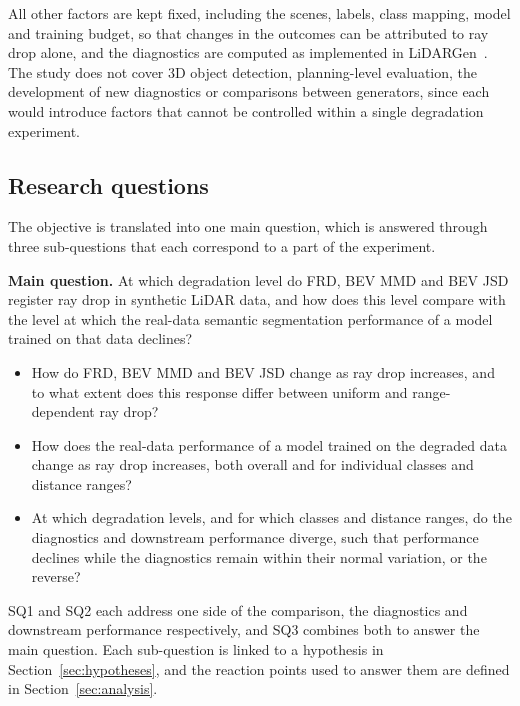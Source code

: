 All other factors are kept fixed, including the scenes, labels, class mapping, model and training budget, so that changes in the outcomes can be attributed to ray drop alone, and the diagnostics are computed as implemented in LiDARGen~\cite{zyrianovLearningGenerateRealistic2022}. The study does not cover 3D object detection, planning-level evaluation, the development of new diagnostics or comparisons between generators, since each would introduce factors that cannot be controlled within a single degradation experiment.

\subsection{Research questions}\label{sec:rq}
The objective is translated into one main question, which is answered through three sub-questions that each correspond to a part of the experiment.

\textbf{Main question.} At which degradation level do FRD, BEV MMD and BEV JSD register ray drop in synthetic LiDAR data, and how does this level compare with the level at which the real-data semantic segmentation performance of a model trained on that data declines?

\begin{itemize}
    \item[\textbf{SQ1}] How do FRD, BEV MMD and BEV JSD change as ray drop increases, and to what extent does this response differ between uniform and range-dependent ray drop?
    \item[\textbf{SQ2}] How does the real-data performance of a model trained on the degraded data change as ray drop increases, both overall and for individual classes and distance ranges?
    \item[\textbf{SQ3}] At which degradation levels, and for which classes and distance ranges, do the diagnostics and downstream performance diverge, such that performance declines while the diagnostics remain within their normal variation, or the reverse?
\end{itemize}

SQ1 and SQ2 each address one side of the comparison, the diagnostics and downstream performance respectively, and SQ3 combines both to answer the main question. Each sub-question is linked to a hypothesis in Section~\ref{sec:hypotheses}, and the reaction points used to answer them are defined in Section~\ref{sec:analysis}.